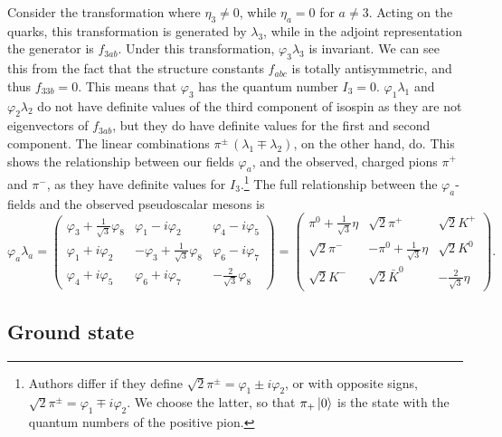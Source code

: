 Consider the transformation where $\eta_3 \neq 0$, while $\eta_a = 0$ for $a\neq 3$.
Acting on the quarks, this transformation is generated by $\lambda_3$, while in the adjoint representation the generator is $f_{3ab}$.
Under this transformation,  $\varphi_3\lambda_3$ is invariant.
We can see this from the fact that the structure constants $f_{abc}$ is totally antisymmetric, and thus $f_{33b} = 0$.
This means that $\varphi_3$ has the quantum number $I_3 = 0$.
$\varphi_1\lambda_1$ and $\varphi_2\lambda_2$ do not have definite values of the third component of isospin as they are not eigenvectors of $f_{3ab}$, but they do have definite values for the first and second component.
The linear combinations $\pi^\pm \, (\lambda_1 \mp \lambda_2)$, on the other hand, do.
This shows the relationship between our fields $\varphi_a$, and the observed, charged pions $\pi^+$ and $\pi^-$, as they have definite values for $I_3$.\footnote{
    Authors differ if they define $\sqrt 2 \pi^\pm = \varphi_1 \pm i \varphi_2$, or with opposite signs, $\sqrt 2 \pi^\pm = \varphi_1 \mp i \varphi_2$.  We choose the latter, so that $\pi_+ \ket{0}$ is the state with the quantum numbers of the positive pion.
    }
The full relationship between the $\varphi_a$-fields  and the observed pseudoscalar mesons is~\autocite{schererIntroductionChiralPerturbation2002}
%
\begin{equation}
    \nonumber
    \varphi_a \lambda_a
    =
    \begin{pmatrix}
        \varphi_3 + \frac{1}{\sqrt{3}} \varphi_8 & \varphi_1 - i \varphi_2 & \varphi_4 - i \varphi_5 \\
        \varphi_1 + i \varphi_2 & - \varphi_3 + \frac{1}{\sqrt{3}} \varphi_8 & \varphi_6 - i \varphi_7  \\
        \varphi_4 + i \varphi_5 & \varphi_6 + i \varphi_7  & - \frac{2}{\sqrt{3}} \varphi_8
    \end{pmatrix}
    =
    \begin{pmatrix}
        \pi^0 + \frac{1}{\sqrt{3}}\eta & \sqrt{2}\pi^+ & \sqrt{2}K^+ \\
        \sqrt{2}\pi^- & -\pi^0 + \frac{1}{\sqrt{3}}\eta & \sqrt{2}K^0 \\
        \sqrt{2}K^- & \sqrt{2}\bar K^0  & - \frac{2}{\sqrt 3} \eta
    \end{pmatrix}.
\end{equation}




\subsection{Ground state}

